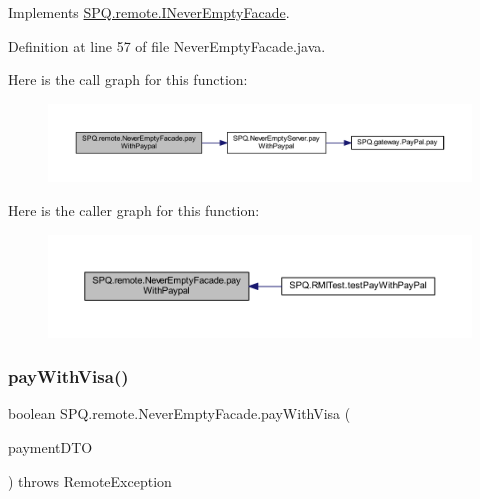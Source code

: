 Implements \mbox{\hyperlink{interface_s_p_q_1_1remote_1_1_i_never_empty_facade_a2d34c64f91537d8c7138094e418de785}{S\+P\+Q.\+remote.\+I\+Never\+Empty\+Facade}}.



Definition at line 57 of file Never\+Empty\+Facade.\+java.

Here is the call graph for this function\+:\nopagebreak
\begin{figure}[H]
\begin{center}
\leavevmode
\includegraphics[width=350pt]{class_s_p_q_1_1remote_1_1_never_empty_facade_a9942c7930b5144f0677dc0fdcde25cc3_cgraph}
\end{center}
\end{figure}
Here is the caller graph for this function\+:\nopagebreak
\begin{figure}[H]
\begin{center}
\leavevmode
\includegraphics[width=350pt]{class_s_p_q_1_1remote_1_1_never_empty_facade_a9942c7930b5144f0677dc0fdcde25cc3_icgraph}
\end{center}
\end{figure}
\mbox{\label{class_s_p_q_1_1remote_1_1_never_empty_facade_a0ff9201cf33cb76c43dd85c892af93ba}} 
\subsubsection{\texorpdfstring{pay\+With\+Visa()}{payWithVisa()}}
{\footnotesize\ttfamily boolean S\+P\+Q.\+remote.\+Never\+Empty\+Facade.\+pay\+With\+Visa (\begin{DoxyParamCaption}\item[{\mbox{\hyperlink{class_s_p_q_1_1dto_1_1_payment_d_t_o}{Payment\+D\+TO}}}]{payment\+D\+TO }\end{DoxyParamCaption}) throws Remote\+Exception}



